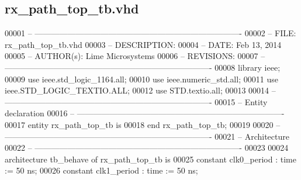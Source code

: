 \subsection{rx\+\_\+path\+\_\+top\+\_\+tb.\+vhd}
\label{rx__path__top__tb_8vhd_source}

\begin{DoxyCode}
00001 \textcolor{keyword}{-- ---------------------------------------------------------------------------- }
00002 \textcolor{keyword}{-- FILE:    rx\_path\_top\_tb.vhd}
00003 \textcolor{keyword}{-- DESCRIPTION: }
00004 \textcolor{keyword}{-- DATE:    Feb 13, 2014}
00005 \textcolor{keyword}{-- AUTHOR(s):   Lime Microsystems}
00006 \textcolor{keyword}{-- REVISIONS:}
00007 \textcolor{keyword}{-- ---------------------------------------------------------------------------- }
00008 \textcolor{vhdlkeyword}{library }\textcolor{keywordflow}{ieee};
00009 \textcolor{vhdlkeyword}{use }ieee.std\_logic\_1164.\textcolor{keywordflow}{all};
00010 \textcolor{vhdlkeyword}{use }ieee.numeric\_std.\textcolor{keywordflow}{all};
00011 \textcolor{vhdlkeyword}{use }ieee.STD\_LOGIC\_TEXTIO.\textcolor{keywordflow}{ALL};
00012 \textcolor{vhdlkeyword}{use }STD.textio.\textcolor{keywordflow}{all};
00013 
00014 \textcolor{keyword}{-- ----------------------------------------------------------------------------}
00015 \textcolor{keyword}{-- Entity declaration}
00016 \textcolor{keyword}{-- ----------------------------------------------------------------------------}
00017 \textcolor{keywordflow}{entity }rx_path_top_tb \textcolor{keywordflow}{is}
00018 \textcolor{keywordflow}{end} \textcolor{vhdlchar}{rx\_path\_top\_tb};
00019 
00020 \textcolor{keyword}{-- ----------------------------------------------------------------------------}
00021 \textcolor{keyword}{-- Architecture}
00022 \textcolor{keyword}{-- ----------------------------------------------------------------------------}
00023 
00024 \textcolor{keywordflow}{architecture} tb\_behave \textcolor{keywordflow}{of} rx_path_top_tb is
00025    \textcolor{keywordflow}{constant} \textcolor{vhdlchar}{clk0_period}   \textcolor{vhdlchar}{:} \textcolor{comment}{time} \textcolor{vhdlchar}{:=} \textcolor{vhdllogic}{}\textcolor{vhdllogic}{50} \textcolor{vhdlchar}{ns};
00026    \textcolor{keywordflow}{constant} \textcolor{vhdlchar}{clk1_period}   \textcolor{vhdlchar}{:} \textcolor{comment}{time} \textcolor{vhdlchar}{:=} \textcolor{vhdllogic}{}\textcolor{vhdllogic}{50} \textcolor{vhdlchar}{ns}; 

\end{DoxyCode}

